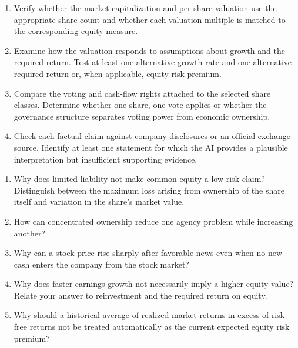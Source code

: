 \begin{enumerate}

\item Verify whether the market capitalization and per-share valuation use the appropriate share count and whether each valuation multiple is matched to the corresponding equity measure.

\item Examine how the valuation responds to assumptions about growth and the required return. Test at least one alternative growth rate and one alternative required return or, when applicable, equity risk premium.

\item Compare the voting and cash-flow rights attached to the selected share classes. Determine whether one-share, one-vote applies or whether the governance structure separates voting power from economic ownership.

\item Check each factual claim against company disclosures or an official exchange source. Identify at least one statement for which the AI provides a plausible interpretation but insufficient supporting evidence.

\end{enumerate}



\begin{enumerate}

\item Why does limited liability not make common equity a low-risk claim? Distinguish between the maximum loss arising from ownership of the share itself and variation in the share's market value.

\item How can concentrated ownership reduce one agency problem while increasing another?

\item Why can a stock price rise sharply after favorable news even when no new cash enters the company from the stock market?

\item Why does faster earnings growth not necessarily imply a higher equity value? Relate your answer to reinvestment and the required return on equity.

\item Why should a historical average of realized market returns in excess of risk-free returns not be treated automatically as the current expected equity risk premium?

\end{enumerate}

